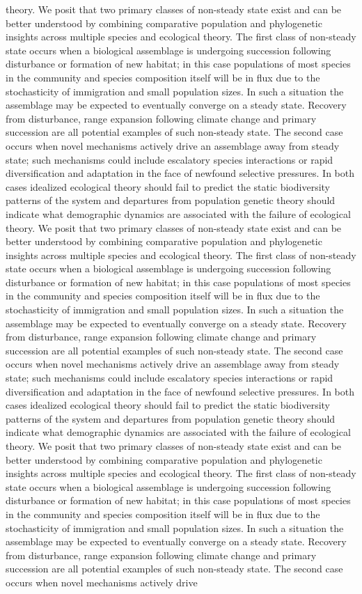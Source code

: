\documentclass[11pt]{article}
\begin{document}
theory. We posit that two primary classes of non-steady state exist and can be better understood by combining comparative population and phylogenetic insights across multiple species and ecological theory. The first class of non-steady state occurs when a biological assemblage is undergoing succession following disturbance or formation of new habitat; in this case populations of most species in the community and species composition itself will be in flux due to the stochasticity of immigration and small population sizes. In such a situation the assemblage may be expected to eventually converge on a steady state. Recovery from disturbance, range expansion following climate change and primary succession are all potential examples of such non-steady state. The second case occurs when novel mechanisms actively drive an assemblage away from steady state; such mechanisms could include escalatory species interactions or rapid diversification and adaptation in the face of newfound selective pressures. In both cases idealized ecological theory should fail to predict the static biodiversity patterns of the system and departures from population genetic theory should indicate what demographic dynamics are associated with the failure of ecological theory. We posit that two primary classes of non-steady state exist and can be better understood by combining comparative population and phylogenetic insights across multiple species and ecological theory. The first class of non-steady state occurs when a biological assemblage is undergoing succession following disturbance or formation of new habitat; in this case populations of most species in the community and species composition itself will be in flux due to the stochasticity of immigration and small population sizes. In such a situation the assemblage may be expected to eventually converge on a steady state. Recovery from disturbance, range expansion following climate change and primary succession are all potential examples of such non-steady state. The second case occurs when novel mechanisms actively drive an assemblage away from steady state; such mechanisms could include escalatory species interactions or rapid diversification and adaptation in the face of newfound selective pressures. In both cases idealized ecological theory should fail to predict the static biodiversity patterns of the system and departures from population genetic theory should indicate what demographic dynamics are associated with the failure of ecological theory. We posit that two primary classes of non-steady state exist and can be better understood by combining comparative population and phylogenetic insights across multiple species and ecological theory. The first class of non-steady state occurs when a biological assemblage is undergoing succession following disturbance or formation of new habitat; in this case populations of most species in the community and species composition itself will be in flux due to the stochasticity of immigration and small population sizes. In such a situation the assemblage may be expected to eventually converge on a steady state. Recovery from disturbance, range expansion following climate change and primary succession are all potential examples of such non-steady state. The second case occurs when novel mechanisms actively drive 
\end{document}
